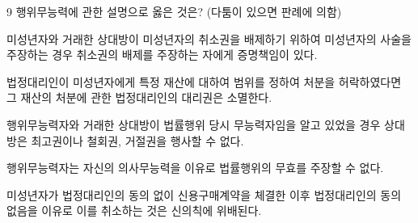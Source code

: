 \begin{question}{9}
행위무능력에 관한 설명으로 옳은 것은? (다툼이 있으면 판례에 의함)
\begin{choices}
  \item 미성년자와 거래한 상대방이 미성년자의 취소권을 배제하기 위하여 미성년자의 사술을 주장하는 경우 취소권의 배제를 주장하는 자에게 증명책임이 있다.
  \item 법정대리인이 미성년자에게 특정 재산에 대하여 범위를 정하여 처분을 허락하였다면 그 재산의 처분에 관한 법정대리인의 대리권은 소멸한다.
  \item 행위무능력자와 거래한 상대방이 법률행위 당시 무능력자임을 알고 있었을 경우 상대방은 최고권이나 철회권, 거절권을 행사할 수 없다.
  \item 행위무능력자는 자신의 의사무능력을 이유로 법률행위의 무효를 주장할 수 없다.
  \item 미성년자가 법정대리인의 동의 없이 신용구매계약을 체결한 이후 법정대리인의 동의 없음을 이유로 이를 취소하는 것은 신의칙에 위배된다.
\end{choices}
\end{question}

